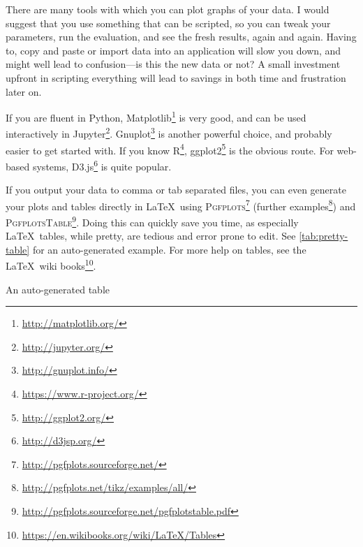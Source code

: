 There are many tools with which you can plot graphs of your data. I would
suggest that you use something that can be scripted, so you can tweak your
parameters, run the evaluation, and see the fresh results, again and
again. Having to, \eg copy and paste or import data into an application will
slow you down, and might well lead to confusion---is this the new data or
not? A small investment upfront in scripting everything will lead to
savings in both time and frustration later on.

If you are fluent in Python,
Matplotlib\footnote{\url{http://matplotlib.org/}} is very good, and can be
used interactively in
Jupyter\footnote{\url{http://jupyter.org/}}. Gnuplot\footnote{\url{http://gnuplot.info/}}
is another powerful choice, and probably easier to get started with. If you
know R\footnote{\url{https://www.r-project.org/}},
ggplot2\footnote{\url{http://ggplot2.org/}} is the obvious route.  For
web-based systems, D3.js\footnote{\url{http://d3jsp.org/}} is quite popular.

If you output your data to comma or tab separated files, you can even
generate your plots and tables directly in \LaTeX\ using
\textsc{Pgfplots}\footnote{\url{http://pgfplots.sourceforge.net/}}
   (further examples\footnote{\url{http://pgfplots.net/tikz/examples/all/}}) and
\textsc{PgfplotsTable}\footnote{\url{http://pgfplots.sourceforge.net/pgfplotstable.pdf}}.
Doing this can quickly save you time, as especially \LaTeX\ tables, while
pretty, are tedious and error prone to edit. See
\autoref{tab:pretty-table} for an auto-generated example. For more help on
tables, see the \LaTeX\ wiki books\footnote{\url{https://en.wikibooks.org/wiki/LaTeX/Tables}}.


\begin{table}
  \myfloatalign
  \caption{An auto-generated table} \label{tab:pretty-table}
\end{table}


